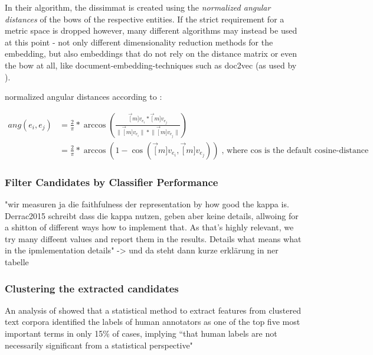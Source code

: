 In their algorithm, the \gls{dissimmat} is created using the \emph{normalized angular distances} of the \glspl{bow} of the respective entities. If the strict requirement for a metric space is dropped however, many different algorithms may instead be used at this point - not only different dimensionality reduction methods for the embedding, but also embeddings that do not rely on the distance matrix or even the \gls{bow} at all, like document-embedding-techniques such as \gls{doc2vec} \cite{Le2014} (as \eg used by \cite{Alshaikh2020}).


normalized angular distances according to \cite{Derrac2015}:

\begin{align}
	ang(e_i, e_j) &= \frac{2}{\pi} * \arccos \left( \frac{\vec[m]{v_{e_i}} * \vec[m]{v_{e_j}}} { \lVert \vec[m]{v_{e_i}} \rVert * \lVert \vec[m]{v_{e_j}} \rVert }  \right)  \label{eq:norm_ang_dist} \\
	&= \frac{2}{\pi} * \arccos(1-\cos(\vec[m]{v_{e_i}},\vec[m]{v_{e_j}})) \text{, where $\cos$ is the default cosine-distance} \nonumber
\end{align}



\subsubsection{Filter Candidates by Classifier Performance}

\label{sec:svm_filter_cands}

 "wir measuren ja die faithfulness der representation by how good the kappa is. Derrac2015 schreibt dass die kappa nutzen, geben aber keine details, allwoing for a shitton of different ways how to implement that. As that's highly relevant, we try many diffeent values and report them in the results. Details what means what in the ipmlementation details" -> und da steht dann kurze erklärung in ner tabelle


\subsubsection{Clustering the extracted candidates}

An analysis of \cite{Carmel2009} showed that a statistical method to extract features from clustered text corpora identified the labels of human annotators as one of the top five most important terms in only 15\% of cases, implying ``that human labels are not necessarily significant from a statistical perspective" \cite[139]{Carmel2009}





